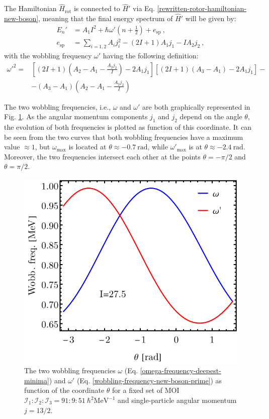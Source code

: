     The Hamiltonian $\hat{H}_\text{rot}$ is connected to $\hat{H}'$ via Eq. \ref{rewritten-rotor-hamiltonian-new-boson}, meaning that the final energy spectrum of $\hat{H}'$ will be given by:
    \begin{align}
        E_n'&=A_1I^2+\hbar\omega'\left(n+\frac{1}{2}\right)+e_\text{sp}\ ,\nonumber\\
        e_\text{sp}&=\sum_{i=1,2}A_ij_i^2-(2I+1)A_1j_1-IA_2j_2\ ,
        \label{energy-2nd-order-expansion-local-minima}
\end{align}
with the wobbling frequency $\omega'$ having the following definition:
\begin{align}
    \omega'^2=&\left[(2I+1)\left(A_2-A_1-\frac{A_2j_2}{I}\right)-2A_1j_1\right]\left[(2I+1)(A_3-A_1)-2A_1j_1\right]-\nonumber\\
    &-(A_3-A_1)\left(A_2-A_1-\frac{A_2j_2}{I}\right)
    \label{wobbling-frequency-new-boson-prime}
\end{align}

The two wobbling frequencies, i.e., $\omega$ and $\omega'$ are both graphically represented in Fig. \ref{wobbling-frequencies-harmonic-approx}. As the angular momentum components $j_1$ and $j_2$ depend on the angle $\theta$, the evolution of both frequencies is plotted as function of this coordinate. It can be seen from the two curves that both wobbling frequencies have a maximum value $\approx1$, but $\omega_\text{max}$ is located at $\theta\approx-0.7\ \text{rad}$, while $\omega'_\text{max}$ is at $\theta\approx-2.4\ \text{rad}$. Moreover, the two frequencies intersect each other at the points $\theta=-\pi/2$ and $\theta=\pi/2$.
\begin{figure}
    \centering
    \includegraphics[scale=0.85]{Chapters/Figures/Wobbling-Frequencies-New-Boson.pdf}
    \caption{The two wobbling frequencies $\omega$ (Eq. \ref{omega-frequency-deepest-minima}) and $\omega'$ (Eq. \ref{wobbling-frequency-new-boson-prime}) as function of the coordinate $\theta$ for a fixed set of MOI $\mathcal{I}_1:\mathcal{I}_2:\mathcal{I}_3=91:9:51\ \hbar^2\text{MeV}^{-1}$ and single-particle angular momentum $j=13/2$.}
    \label{wobbling-frequencies-harmonic-approx}
\end{figure}

